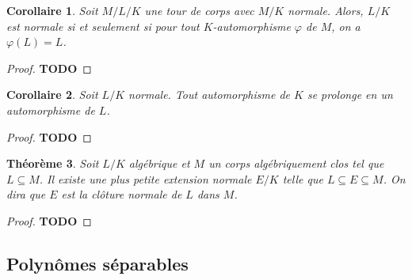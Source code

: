 \documentclass{article}
\newcommand{\todo}{\textbf{TODO}}
\theoremstyle{plain}
\newtheorem{theorem}{Théorème}[section]
\newtheorem{corollary}[theorem]{Corollaire}
\theoremstyle{definition}
\theoremstyle{remark}
\begin{document}
\begin{corollary}
    Soit $M/L/K$ une tour de corps avec $M/K$ normale. Alors, $L/K$ est normale si et seulement si pour tout $K$-automorphisme $\varphi$ de $M$, on a $\varphi(L) = L$.
\end{corollary}

\begin{proof}
    \todo
\end{proof}

\begin{corollary}
    Soit $L/K$ normale. Tout automorphisme de $K$ se prolonge en un automorphisme de $L$.
\end{corollary}

\begin{proof}
    \todo
\end{proof}

\begin{theorem}
    Soit $L/K$ algébrique et $M$ un corps algébriquement clos tel que $L \subseteq M$. Il existe une plus petite extension normale $E/K$ telle que $L \subseteq E \subseteq M$. On dira que $E$ est la \emph{clôture normale de $L$ dans $M$}.
\end{theorem}

\begin{proof}
    \todo
\end{proof}

\subsection{Polynômes séparables}
\end{document}
